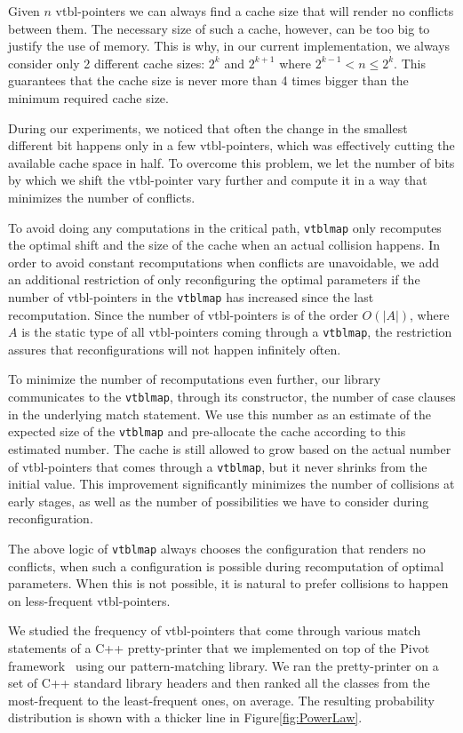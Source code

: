 \documentclass[preprint]{sigplanconf}
\makeatletter
\DeclareRobustCommand{\code}[1]{{\lstinline[breaklines=false,escapechar=@]{#1}}}
\makeatother
\begin{document}
Given $n$ vtbl-pointers we can always find a cache size that will render no 
conflicts between them. The necessary size of such a cache, however, can be too 
big to justify the use of memory. This is why, in our current implementation, we 
always consider only 2 different cache sizes: $2^k$ and $2^{k+1}$ where 
$2^{k-1} < n \leq 2^k$. This guarantees that the cache size is never more than 4 
times bigger than the minimum required cache size.

During our experiments, we noticed that often the change in the smallest 
different bit happens only in a few vtbl-pointers, which was effectively 
cutting the available cache space in half. To overcome this problem, we let the 
number of bits by which we shift the vtbl-pointer vary further and compute it in 
a way that minimizes the number of conflicts.

To avoid doing any computations in the critical path, \code{vtblmap} only 
recomputes the optimal shift and the size of the cache when an actual collision 
happens. In order to avoid constant recomputations when conflicts are unavoidable, 
we add an additional restriction of only reconfiguring the optimal parameters if 
the number of vtbl-pointers in the \code{vtblmap} has increased since the last 
recomputation. Since the number of vtbl-pointers is of the order $O(|A|)$, where 
$A$ is the static type of all vtbl-pointers coming through a \code{vtblmap}, the 
restriction assures that reconfigurations will not happen infinitely often.

To minimize the number of recomputations even further, our library communicates 
to the \code{vtblmap}, through its constructor, the number of case clauses in 
the underlying match statement. We use this number as an estimate of the expected 
size of the \code{vtblmap} and pre-allocate the cache according to this estimated 
number. The cache is still allowed to grow based on the actual number of 
vtbl-pointers that comes through a \code{vtblmap}, but it never shrinks from the
initial value. This improvement significantly minimizes the number of collisions 
at early stages, as well as the number of possibilities we have to consider 
during reconfiguration.

The above logic of \code{vtblmap} always chooses the configuration that renders 
no conflicts, when such a configuration is possible during recomputation of 
optimal parameters. When this is not possible, it is natural to prefer collisions 
to happen on less-frequent vtbl-pointers.

We studied the frequency of vtbl-pointers that come through various match statements
of a C++ pretty-printer that we implemented on top of the Pivot 
framework~\cite{Pivot09} using our pattern-matching library. We ran the 
pretty-printer on a set of C++ standard library headers and then ranked all the  
classes from the most-frequent to the least-frequent ones, on average. The 
resulting probability distribution is shown with a thicker line in 
Figure\ref{fig:PowerLaw}.
\end{document}
